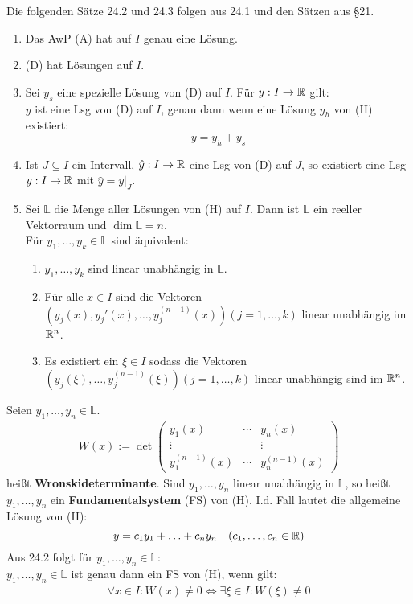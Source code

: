 \documentclass[a4paper,twoside,DIV15,BCOR12mm,chapterprefix=true,headings=twolinechapter]{scrbook}
\begin{document}
Die folgenden Sätze 24.2 und 24.3 folgen aus 24.1 und den Sätzen aus §21.

\begin{satz}
\begin{enumerate}
\item Das AwP (A) hat auf $I$ genau eine Lösung.
\item (D) hat Lösungen auf $I$.
\item Sei $y_s$ eine spezielle Lösung von (D) auf $I$. Für $y:I\to\mathbb{R}$ gilt:\\
$y$ ist eine Lsg von (D) auf $I$, genau dann wenn eine Lösung $y_h$ von (H) existiert:
\[y=y_h+y_s\]
\item Ist $J\subseteq I$ ein Intervall, $\hat y:I\to\mathbb{R}$ eine Lsg von (D) auf $J$,
so existiert eine Lsg $y:I\to\mathbb{R}$ mit $\hat y=y|_J$.
\item Sei $\mathbb{L}$ die Menge aller Lösungen von (H) auf $I$. Dann ist $\mathbb{L}$
ein reeller Vektorraum und $\dim\mathbb{L}=n$.\\
Für $y_1,\ldots,y_k\in\mathbb{L}$ sind äquivalent:
\begin{enumerate}
\item $y_1,\ldots,y_k$ sind linear unabhängig in $\mathbb{L}$.
\item Für alle $x\in I$ sind die Vektoren $(y_j(x),y_j'(x),\ldots,y_j^{(n-1)}(x)) (j=1,\ldots,k)$
linear unabhängig im $\mathbb{R}^n$.
\item Es existiert ein $\xi\in I$ sodass die Vektoren $(y_j(\xi),\ldots,y_j^{(n-1)}(\xi)) (j=1,\ldots,k)$
linear unabhängig sind im $\mathbb{R}^n$.
\end{enumerate}
\end{enumerate}
\end{satz}

\begin{definition}
Seien $y_1,\ldots,y_n\in\mathbb{L}$.
\begin{align*}
W(x):= \det\begin{pmatrix}
y_1(x)&\cdots&y_n(x)\\
\vdots& &\vdots\\
y_1^{(n-1)}(x)&\cdots&y_n^{(n-1)}(x)
\end{pmatrix}
\end{align*}
heißt \textbf{Wronskideterminante}. Sind $y_1,\ldots,y_n$ linear unabhängig in $\mathbb{L}$,
so heißt $y_1,\ldots,y_n$ ein \textbf{Fundamentalsystem} (FS) von (H). I.d. Fall 
lautet die allgemeine Lösung von (H):
\[y=c_1y_1+\ldots+c_ny_n \quad (c_1,\ldots,c_n\in\mathbb{R})\]
Aus 24.2 folgt für $y_1,\ldots,y_n\in\mathbb{L}$:\\
$y_1,\ldots,y_n\in\mathbb{L}$ ist genau dann ein FS von (H), wenn gilt:
\begin{align*}
\forall x\in I: W(x)\ne 0 \iff \exists\xi\in I:W(\xi)\ne 0
\end{align*}
\end{definition}
\end{document}
